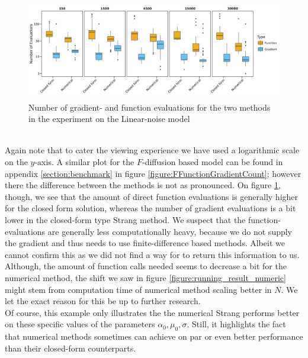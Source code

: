 \begin{figure}[h!]
    \begin{center}
    \includegraphics[scale = .08]{figures/function_gradient_count_Linear_plot.jpeg}     
    \caption{Number of gradient- and function evaluations for the two methods in the experiment on the Linear-noise model}
    \label{figure:linearFunctionGradientCount}   
    \end{center}
\end{figure}\\
Again note that to cater the viewing experience we have used a logarithmic scale on the $y$-axis. A similar plot for the $F$-diffusion based model can be found in appendix \ref{section:benchmark} in figure \ref{figure:FFunctionGradientCount}; however there the difference between the methods is not as pronounced. On figure \ref{figure:linearFunctionGradientCount}, though, we see that the amount of direct function evaluations is generally higher for the closed form solution, whereas the number of gradient evaluations is a bit lower in the closed-form type Strang method. We suspect that the function-evaluations are generally less computationally heavy, because we do not supply the gradient and  thus needs to use finite-difference based methods. Albeit we cannot confirm this as we did not find a way for  to return this information to us. Although, the amount of function calls needed seems to decrease a bit for the numerical method, the shift we saw in figure \ref{figure:running_result_numeric} might stem from computation time of numerical method scaling better in $N$. We let the exact reason for this be up to further research. \\
Of course, this example only illustrates the the numerical Strang performs better on these specific values of the parameters $\alpha_0, \mu_0, \sigma$. Still, it highlights the fact that numerical methods sometimes can achieve on par or even better performance than their closed-form counterparts.
